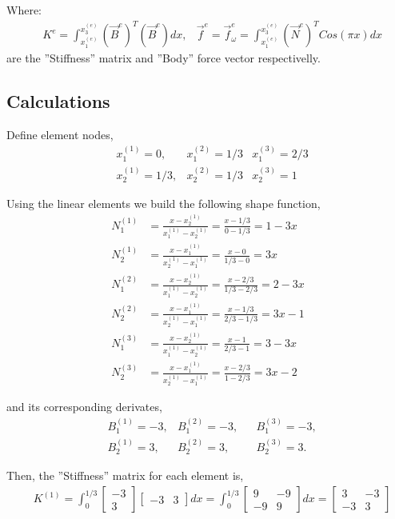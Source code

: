 \documentclass[a4paper]{memoir}
\begin{document}
Where:
\begin{align*}
	& K^e = \int_{x_1^{(e)}}^{x_3^{(e)}} (\vec{B}^e)^T (\vec{B}^e) dx, & \vec{f}^e = \vec{f}_\omega^e = \int_{x_1^{(e)}}^{x_3^{(e)}} (\vec{N}^e)^T Cos(\pi x) dx
\end{align*}
are the ''Stiffness'' matrix and ''Body'' force vector respectivelly.

\subsection{Calculations}
Define element nodes,
\begin{align*}
	&x_1^{(1)} = 0, &x_1^{(2)} = 1/3 &x_1^{(3)} = 2/3 \\
	&x_2^{(1)} = 1/3, &x_2^{(2)} = 1/3 &x_2^{(3)} = 1 
\end{align*}

Using the linear elements we build the following shape function,
\begin{align*}
	N_1^{(1)} &= \frac{x-x_2^{(1)}}{x_1^{(1)}-x_2^{(1)}} = \frac{x-1/3}{0-1/3} = 1-3x \\
	N_2^{(1)} &= \frac{x-x_1^{(1)}}{x_2^{(1)}-x_1^{(1)}} = \frac{x-0}{1/3-0} = 3x \\
	N_1^{(2)} &= \frac{x-x_2^{(1)}}{x_1^{(1)}-x_2^{(1)}} = \frac{x-2/3}{1/3-2/3} = 2-3x \\
	N_2^{(2)} &= \frac{x-x_1^{(1)}}{x_2^{(1)}-x_1^{(1)}} = \frac{x-1/3}{2/3-1/3} = 3x-1 \\ 
	N_1^{(3)} &= \frac{x-x_2^{(1)}}{x_1^{(1)}-x_2^{(1)}} = \frac{x-1}{2/3-1} = 3-3x \\
	N_2^{(3)} &= \frac{x-x_1^{(1)}}{x_2^{(1)}-x_1^{(1)}} = \frac{x-2/3}{1-2/3} = 3x-2
\end{align*}

and its corresponding derivates,
\begin{align*}
	&B_1^{(1)} = -3, 	&B_1^{(2)} = -3,&	&B_1^{(3)} = -3, \\
	&B_2^{(1)} = 3,		&B_2^{(2)} = 3,&	&B_2^{(3)} = 3.
\end{align*}

Then, the ''Stiffness'' matrix for each element is,
\begin{align*}
	& K^{(1)} = \int_0^{1/3} 
	\begin{bmatrix}
		-3 \\
		3
	\end{bmatrix}
	\begin{bmatrix}
		-3 & 3 
	\end{bmatrix}
	dx = \int_0^{1/3} 
	\begin{bmatrix}
		 9 & -9 \\
		-9 &  9
	\end{bmatrix}
	dx = 
	\begin{bmatrix}
		 3 & -3 \\
		-3 &  3
	\end{bmatrix}	
\end{align*}
\end{document}
